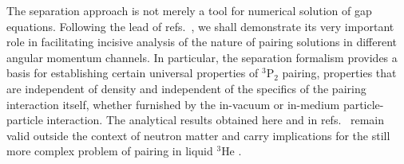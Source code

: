 The separation approach is not merely a tool for numerical solution
of gap equations.  Following the lead of refs.~\cite{kkc,luso,univ,van}, 
we shall demonstrate its very important role in facilitating incisive 
analysis of the nature of pairing solutions in different angular momentum 
channels.  In particular, the separation formalism provides a basis 
for establishing certain universal properties of $^3$P$_2$ pairing, 
properties that are independent of density and independent of the 
specifics of the pairing interaction itself, whether furnished by the 
in-vacuum or in-medium particle-particle interaction.  The analytical 
results obtained here and in refs.~\cite{univ,van} remain valid 
outside the context of neutron matter and carry implications for the 
still more complex problem of pairing in liquid $^3$He \cite{vol}.


